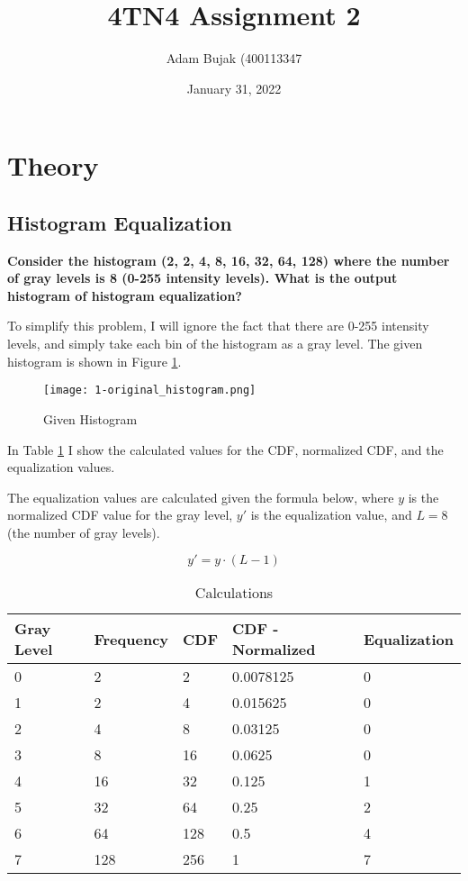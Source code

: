 \documentclass[12pt, letterpaper]{article}
\title{4TN4 Assignment 2}
\author{Adam Bujak (400113347}
\date{January 31, 2022}
\begin{document}
\maketitle

\section{Theory}


\subsection{Histogram Equalization}

\textbf{Consider the histogram (2, 2, 4, 8, 16, 32, 64, 128) where the number of gray levels is 8 (0-255 intensity levels).
What is the output histogram of histogram equalization?}

To simplify this problem, I will ignore the fact that there are 0-255 intensity levels, and simply take each bin of the histogram as a gray level. The given histogram is shown in Figure \ref{fig:original-histogram}.


\begin{figure}[h]
    \centering
    \texttt{[image: 1-original\_histogram.png]}
    \caption{Given Histogram}
    \label{fig:original-histogram}
\end{figure}

In Table \ref{tab:histogram-calc} I show the calculated values for the CDF, normalized CDF, and the equalization values.

The equalization values are calculated given the formula below, where $y$ is the normalized CDF value for the gray level, $y'$ is the equalization value, and $L = 8$ (the number of gray levels).

\[ y' =  y \cdot (L-1)\]

\begin{table}[H]
    \centering
    \begin{tabular}{|l|l|l|l|l|}
    \hline
        Gray Level & Frequency & CDF & CDF - Normalized & Equalization  \\ \hline
        0 & 2 & 2 & 0.0078125 & 0  \\
        1 & 2 & 4 & 0.015625 & 0  \\ 
        2 & 4 & 8 & 0.03125 & 0  \\ 
        3 & 8 & 16 & 0.0625 & 0  \\ 
        4 & 16 & 32 & 0.125 & 1  \\ 
        5 & 32 & 64 & 0.25 & 2  \\ 
        6 & 64 & 128 & 0.5 & 4  \\ 
        7 & 128 & 256 & 1 & 7 \\ \hline
    \end{tabular}
    \caption{Calculations}
    \label{tab:histogram-calc}
\end{table}
\end{document}
